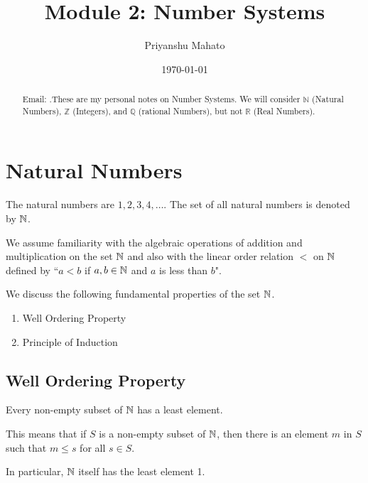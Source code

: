 \documentclass[11pt]{scrartcl}
\begin{document}
	\title{Module 2: Number Systems}
	\author{Priyanshu Mahato}
	\date{\today}
	\maketitle
	
	\begin{abstract}
		Email: .These are my personal notes on Number Systems. We will consider $\mathbb{N}$ (Natural Numbers), $\mathbb{Z}$ (Integers), and $\mathbb{Q}$ (rational Numbers), but not $\mathbb{R}$ (Real Numbers).
	\end{abstract}

	\section{Natural Numbers}
	
		The natural numbers are $1,2,3,4,\dots$. The set of all natural numbers is denoted by $\mathbb N$.
		
		\begin{definition}
			We assume familiarity with the algebraic operations of addition and multiplication on the set $\mathbb N$ and also with the linear order relation $<$ on $\mathbb N$ defined by ``$a<b$ if $a, b \in \mathbb N$ and $a$ is less than $b$".
		\end{definition}
	
		We discuss the following fundamental properties of the set $\mathbb N$.
		
		\begin{enumerate}
			\item Well Ordering Property
			\item  Principle of Induction
		\end{enumerate}
	
	\subsection{Well Ordering Property}
		\begin{definition}
			Every non-empty subset of $\mathbb N$ has a least element.
		\end{definition}
		This means that if $S$ is a non-empty subset of $\mathbb N$, then there is an element $m$ in $S$ such that $m \leq s$ for all $s \in S$.
		
		In particular, $\mathbb N$ itself has the least element 1.
		
\end{document}
